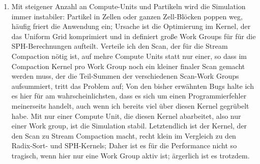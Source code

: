 \begin{enumerate}
		\item 
		\label{enum:oclSyncBug}		
		Mit steigener Anzahl an Compute-Units und Partikeln wird die Simulation immer instabiler:
		Partikel in Zellen oder ganzen Zell-Blöcken poppen weg, häufig friert die Anwendung ein; Ursache ist die 
		Optimierung im Kernel, der das Uniform Grid komprimiert und in definiert große Work Groups für für
		die SPH-Berechnungen aufteilt.
		Verteile ich den Scan, der für die Stream Compaction nötig ist, auf mehre Compute Units statt nur einer,
		so dass im Compaction Kernel pro Work Group noch ein kleiner finaler Scan gemacht werden muss,
		der die Teil-Summen der verschiedenen Scan-Work Groups aufsummiert, tritt das Problem auf;
		Von den bisher erwähnten Bugs halte ich es hier für am wahrscheinlichsten, dass es sich um einen Programmierfehler 
		meinerseits handelt, auch wenn ich bereits viel über diesen Kernel gegrübelt habe.
		Mit nur einer Compute Unit, die diesen Kernel abarbeitet, also nur einer Work group, ist die Simulation stabil.
		Letztendlich ist der Kernel, der den Scan zu Stream Compaction macht, recht klein im Vergleich zu den
		Radix-Sort- und SPH-Kernels; Daher ist es für die Performance nicht so tragisch, wenn hier nur eine Work 
		Group aktiv ist; ärgerlich ist es trotzdem.
		\end{enumerate}

\clearpage
